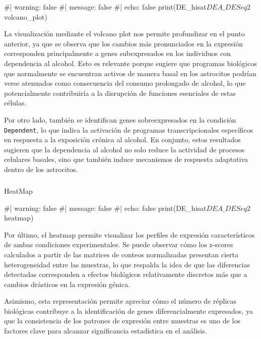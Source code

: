 \documentclass[
  10pt,
]{article}
\makeatletter
\let\oldsubparagraph\subparagraph
\renewcommand{\subparagraph}{
    \@ifstar
      \xxxSubParagraphStar
      \xxxSubParagraphNoStar
  }
\newcommand{\xxxSubParagraphStar}[1]{\oldsubparagraph*{#1}\mbox{}}
\newcommand{\xxxSubParagraphNoStar}[1]{\oldsubparagraph{#1}\mbox{}}
\newenvironment{Shaded}{\begin{snugshade}}{\end{snugshade}}
\newcommand{\NormalTok}[1]{\textcolor[rgb]{0.00,0.23,0.31}{#1}}
\makeatother
\begin{document}
\begin{Shaded}
\begin{Highlighting}[]
\NormalTok{\#| warning: false}
\NormalTok{\#| message: false}
\NormalTok{\#| echo: false}
\NormalTok{print(DE\_hisat$DEA\_DESeq2$volcano\_plot)}
\end{Highlighting}
\end{Shaded}

La visualización mediante el volcano plot nos permite profundizar en el
punto anterior, ya que se observa que los cambios más pronunciados en la
expresión corresponden principalmente a genes subexpresados en los
individuos con dependencia al alcohol. Esto es relevante porque sugiere
que programas biológicos que normalmente se encuentran activos de manera
basal en los astrocitos podrían verse atenuados como consecuencia del
consumo prolongado de alcohol, lo que potencialmente contribuiría a la
disrupción de funciones esenciales de estas células.

Por otro lado, también se identifican genes sobreexpresados en la
condición \texttt{Dependent}, lo que indica la activación de programas
transcripcionales específicos en respuesta a la exposición crónica al
alcohol. En conjunto, estos resultados sugieren que la dependencia al
alcohol no solo reduce la actividad de procesos celulares basales, sino
que también induce mecanismos de respuesta adaptativa dentro de los
astrocitos.

\subparagraph{HeatMap}\label{heatmap-1}

\begin{Shaded}
\begin{Highlighting}[]
\NormalTok{\#| warning: false}
\NormalTok{\#| message: false}
\NormalTok{\#| echo: false}
\NormalTok{print(DE\_hisat$DEA\_DESeq2$heatmap)}
\end{Highlighting}
\end{Shaded}

Por último, el heatmap permite visualizar los perfiles de expresión
característicos de ambas condiciones experimentales. Se puede observar
cómo los z-scores calculados a partir de las matrices de conteos
normalizadas presentan cierta heterogeneidad entre las muestras, lo que
respalda la idea de que las diferencias detectadas corresponden a
efectos biológicos relativamente discretos más que a cambios drásticos
en la expresión génica.

Asimismo, esta representación permite apreciar cómo el número de
réplicas biológicas contribuye a la identificación de genes
diferencialmente expresados, ya que la consistencia de los patrones de
expresión entre muestras es uno de los factores clave para alcanzar
significancia estadística en el análisis.
\end{document}

